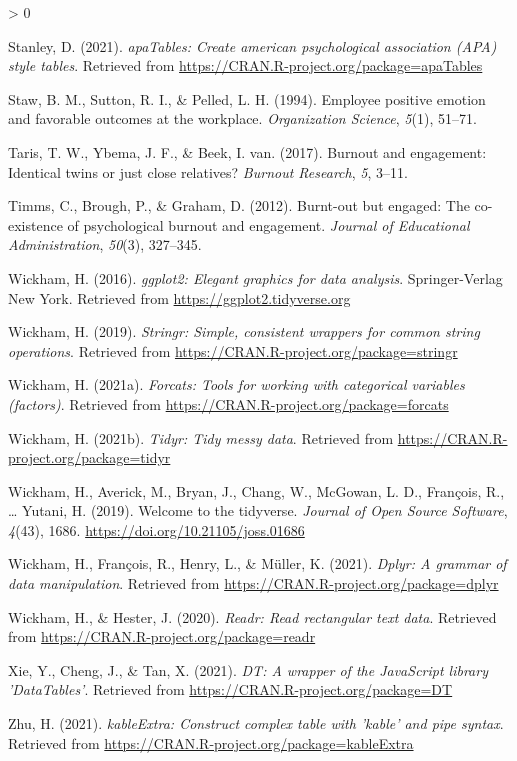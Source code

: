 \documentclass[
  english,
  man]{apa6}
\newlength{\cslhangindent}
\newenvironment{CSLReferences}[2] %
 {%
  \setlength{\parindent}{0pt}
  \ifodd #1 \everypar{\setlength{\hangindent}{\cslhangindent}}\ignorespaces\fi
  \ifnum #2 > 0
  \setlength{\parskip}{#2\baselineskip}
  \fi
 }%
 {}
\begin{document}
\begin{CSLReferences}{1}{0}
\leavevmode\hypertarget{ref-R-apaTables}{}%
Stanley, D. (2021). \emph{apaTables: Create american psychological association (APA) style tables}. Retrieved from \url{https://CRAN.R-project.org/package=apaTables}

\leavevmode\hypertarget{ref-staw_employee_1994}{}%
Staw, B. M., Sutton, R. I., \& Pelled, L. H. (1994). Employee positive emotion and favorable outcomes at the workplace. \emph{Organization Science}, \emph{5}(1), 51--71.

\leavevmode\hypertarget{ref-taris2017burnout}{}%
Taris, T. W., Ybema, J. F., \& Beek, I. van. (2017). Burnout and engagement: Identical twins or just close relatives? \emph{Burnout Research}, \emph{5}, 3--11.

\leavevmode\hypertarget{ref-timms2012burnt}{}%
Timms, C., Brough, P., \& Graham, D. (2012). Burnt-out but engaged: The co-existence of psychological burnout and engagement. \emph{Journal of Educational Administration}, \emph{50}(3), 327--345.

\leavevmode\hypertarget{ref-R-ggplot2}{}%
Wickham, H. (2016). \emph{ggplot2: Elegant graphics for data analysis}. Springer-Verlag New York. Retrieved from \url{https://ggplot2.tidyverse.org}

\leavevmode\hypertarget{ref-R-stringr}{}%
Wickham, H. (2019). \emph{Stringr: Simple, consistent wrappers for common string operations}. Retrieved from \url{https://CRAN.R-project.org/package=stringr}

\leavevmode\hypertarget{ref-R-forcats}{}%
Wickham, H. (2021a). \emph{Forcats: Tools for working with categorical variables (factors)}. Retrieved from \url{https://CRAN.R-project.org/package=forcats}

\leavevmode\hypertarget{ref-R-tidyr}{}%
Wickham, H. (2021b). \emph{Tidyr: Tidy messy data}. Retrieved from \url{https://CRAN.R-project.org/package=tidyr}

\leavevmode\hypertarget{ref-R-tidyverse}{}%
Wickham, H., Averick, M., Bryan, J., Chang, W., McGowan, L. D., François, R., \ldots{} Yutani, H. (2019). Welcome to the {tidyverse}. \emph{Journal of Open Source Software}, \emph{4}(43), 1686. \url{https://doi.org/10.21105/joss.01686}

\leavevmode\hypertarget{ref-R-dplyr}{}%
Wickham, H., François, R., Henry, L., \& Müller, K. (2021). \emph{Dplyr: A grammar of data manipulation}. Retrieved from \url{https://CRAN.R-project.org/package=dplyr}

\leavevmode\hypertarget{ref-R-readr}{}%
Wickham, H., \& Hester, J. (2020). \emph{Readr: Read rectangular text data}. Retrieved from \url{https://CRAN.R-project.org/package=readr}

\leavevmode\hypertarget{ref-R-DT}{}%
Xie, Y., Cheng, J., \& Tan, X. (2021). \emph{DT: A wrapper of the JavaScript library 'DataTables'}. Retrieved from \url{https://CRAN.R-project.org/package=DT}

\leavevmode\hypertarget{ref-R-kableExtra}{}%
Zhu, H. (2021). \emph{kableExtra: Construct complex table with 'kable' and pipe syntax}. Retrieved from \url{https://CRAN.R-project.org/package=kableExtra}

\end{CSLReferences}

\endgroup
\end{document}
